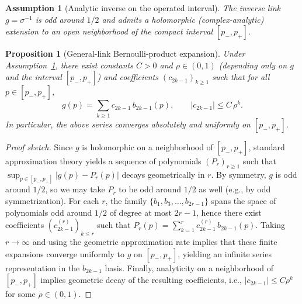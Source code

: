 \documentclass[11pt]{article}
\theoremstyle{plain}
\newtheorem{proposition}[theorem]{Proposition}
\newtheorem{assumption}[theorem]{Assumption}
\theoremstyle{remark}
\newcommand{\1}{\mathbf{1}}
\begin{document}
\begin{assumption}[Analytic inverse on the operated interval]\label{ass:general_link_simple}
The inverse link $g=\sigma^{-1}$ is odd around $1/2$ and admits a holomorphic (complex-analytic) extension
to an open neighborhood of the compact interval $[p_-,p_+]$.
\end{assumption}

\begin{propbox}
\begin{proposition}[General-link Bernoulli-product expansion]\label{prop:general_link_simple}
Under Assumption~\ref{ass:general_link_simple}, there exist constants $C>0$ and $\rho\in(0,1)$
(depending only on $g$ and the interval $[p_-,p_+]$) and coefficients $(c_{2k-1})_{k\ge1}$ such that for all
$p\in[p_-,p_+]$,
$$
g(p)=\sum_{k\ge1} c_{2k-1}\,b_{2k-1}(p),
\qquad
|c_{2k-1}|\le C\,\rho^k.
$$
In particular, the above series converges absolutely and uniformly on $[p_-,p_+]$.
\end{proposition}
\end{propbox}

\begin{proof}[Proof sketch]
Since $g$ is holomorphic on a neighborhood of $[p_-,p_+]$, standard approximation theory yields a sequence of
polynomials $(P_r)_{r\ge1}$ such that $\sup_{p\in[p_-,p_+]}|g(p)-P_r(p)|$ decays geometrically in $r$.
By symmetry, $g$ is odd around $1/2$, so we may take $P_r$ to be odd around $1/2$ as well (e.g., by odd symmetrization). For each $r$, the family $\{b_{1},b_{3},\dots,b_{2r-1}\}$ spans the space of polynomials odd around $1/2$
of degree at most $2r-1$, hence there exist coefficients $(c^{(r)}_{2k-1})_{k\le r}$ such that
$P_r(p)=\sum_{k=1}^{r} c^{(r)}_{2k-1}\,b_{2k-1}(p)$.
Taking $r\to\infty$ and using the geometric approximation rate implies that these finite expansions converge
uniformly to $g$ on $[p_-,p_+]$, yielding an infinite series representation in the $b_{2k-1}$ basis.
Finally, analyticity on a neighborhood of $[p_-,p_+]$ implies geometric decay of the resulting coefficients,
i.e., $|c_{2k-1}|\le C\rho^k$ for some $\rho\in(0,1)$.
\end{proof}
\end{document}
